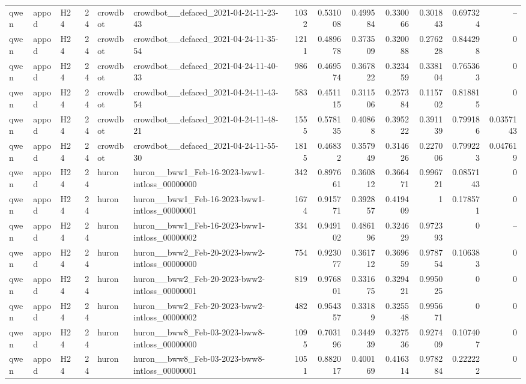\begin{longtable}{lllrllrrrrrrr}
qwen & appod & H24 & 24 & crowdbot & crowdbot\_\_defaced\_2021-04-24-11-23-43 & 1032 & 0.531008 & 0.499584 & 0.330066 & 0.301843 & 0.697324 & -- \\
qwen & appod & H24 & 24 & crowdbot & crowdbot\_\_defaced\_2021-04-24-11-35-54 & 1211 & 0.489678 & 0.373509 & 0.320088 & 0.276228 & 0.844298 & 0 \\
qwen & appod & H24 & 24 & crowdbot & crowdbot\_\_defaced\_2021-04-24-11-40-33 & 986 & 0.469574 & 0.367822 & 0.323459 & 0.338104 & 0.765363 & 0 \\
qwen & appod & H24 & 24 & crowdbot & crowdbot\_\_defaced\_2021-04-24-11-43-54 & 583 & 0.451115 & 0.311506 & 0.257384 & 0.115702 & 0.818815 & 0 \\
qwen & appod & H24 & 24 & crowdbot & crowdbot\_\_defaced\_2021-04-24-11-48-21 & 1555 & 0.578135 & 0.40868 & 0.395222 & 0.391139 & 0.799186 & 0.0357143 \\
qwen & appod & H24 & 24 & crowdbot & crowdbot\_\_defaced\_2021-04-24-11-55-30 & 1815 & 0.46832 & 0.357949 & 0.314626 & 0.227006 & 0.799223 & 0.047619 \\
qwen & appod & H24 & 24 & huron & huron\_\_bww1\_Feb-16-2023-bww1-intloss\_00000000 & 342 & 0.897661 & 0.360812 & 0.366471 & 0.996721 & 0.0857143 & 0 \\
qwen & appod & H24 & 24 & huron & huron\_\_bww1\_Feb-16-2023-bww1-intloss\_00000001 & 1674 & 0.915771 & 0.392857 & 0.419409 & 1 & 0.178571 & 0 \\
qwen & appod & H24 & 24 & huron & huron\_\_bww1\_Feb-16-2023-bww1-intloss\_00000002 & 334 & 0.949102 & 0.486196 & 0.324629 & 0.972393 & 0 & -- \\
qwen & appod & H24 & 24 & huron & huron\_\_bww2\_Feb-20-2023-bww2-intloss\_00000000 & 754 & 0.923077 & 0.361712 & 0.369659 & 0.978754 & 0.106383 & 0 \\
qwen & appod & H24 & 24 & huron & huron\_\_bww2\_Feb-20-2023-bww2-intloss\_00000001 & 819 & 0.976801 & 0.331675 & 0.329421 & 0.995025 & 0 & 0 \\
qwen & appod & H24 & 24 & huron & huron\_\_bww2\_Feb-20-2023-bww2-intloss\_00000002 & 482 & 0.954357 & 0.33189 & 0.325548 & 0.995671 & 0 & 0 \\
qwen & appod & H24 & 24 & huron & huron\_\_bww8\_Feb-03-2023-bww8-intloss\_00000000 & 1095 & 0.703196 & 0.344939 & 0.327536 & 0.927409 & 0.107407 & 0 \\
qwen & appod & H24 & 24 & huron & huron\_\_bww8\_Feb-03-2023-bww8-intloss\_00000001 & 1051 & 0.882017 & 0.400169 & 0.416314 & 0.978284 & 0.222222 & 0 \\

\end{longtable}
